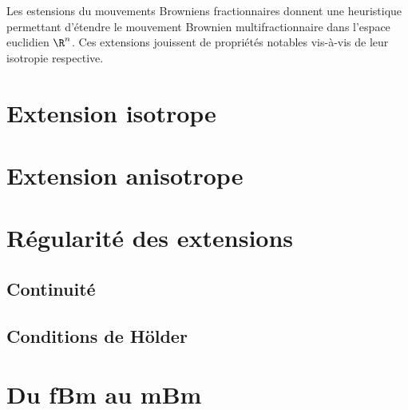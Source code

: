 
Les estensions du mouvements Browniens fractionnaires donnent une
heuristique permettant d'étendre le mouvement Brownien
multifractionnaire dans l'espace euclidien $\R^n$. Ces extensions
jouissent de propriétés notables vis-à-vis de leur isotropie
respective.

\section{Extension isotrope}
\section{Extension anisotrope}
\section{Régularité des extensions}
\subsection{Continuité}
\subsection{Conditions de Hölder}
\section{Du fBm au mBm}
